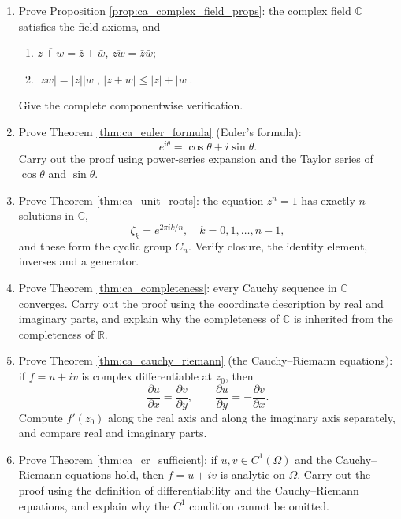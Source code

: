 \begin{enumerate}[leftmargin=3em, label=\textbf{Exercise \arabic*}]

    \item Prove Proposition \ref{prop:ca_complex_field_props}:
    the complex field $\mathbb{C}$ satisfies the field axioms, and
    \begin{enumerate}[label=(\roman*)]
        \item $\overline{z+w}=\bar{z}+\bar{w}$, $\overline{zw}=\bar{z}\bar{w}$;
        \item $|zw|=|z||w|$, $|z+w|\le|z|+|w|$.
    \end{enumerate}
    Give the complete componentwise verification.

    \item Prove Theorem \ref{thm:ca_euler_formula} (Euler's formula):
    \[
    e^{i\theta}=\cos\theta+i\sin\theta.
    \]
    Carry out the proof using power-series expansion and the Taylor series of $\cos\theta$ and $\sin\theta$.

    \item Prove Theorem \ref{thm:ca_unit_roots}:
    the equation $z^n=1$ has exactly $n$ solutions in $\mathbb{C}$,
    \[
    \zeta_k=e^{2\pi ik/n},\quad k=0,1,\dots,n-1,
    \]
    and these form the cyclic group $C_n$.
    Verify closure, the identity element, inverses and a generator.

    \item Prove Theorem \ref{thm:ca_completeness}:
    every Cauchy sequence in $\mathbb{C}$ converges.
    Carry out the proof using the coordinate description by real and imaginary parts,
    and explain why the completeness of $\mathbb{C}$ is inherited from the completeness of $\mathbb{R}$.

    \item Prove Theorem \ref{thm:ca_cauchy_riemann} (the Cauchy--Riemann equations):
    if $f=u+iv$ is complex differentiable at $z_0$, then
    \[
    \frac{\partial u}{\partial x}=\frac{\partial v}{\partial y},\qquad
    \frac{\partial u}{\partial y}=-\frac{\partial v}{\partial x}.
    \]
    Compute $f'(z_0)$ along the real axis and along the imaginary axis separately, and compare real and imaginary parts.

    \item Prove Theorem \ref{thm:ca_cr_sufficient}:
    if $u,v\in C^1(\Omega)$ and the Cauchy--Riemann equations hold,
    then $f=u+iv$ is analytic on $\Omega$.
    Carry out the proof using the definition of differentiability and the Cauchy--Riemann equations,
    and explain why the $C^1$ condition cannot be omitted.


\end{enumerate}

